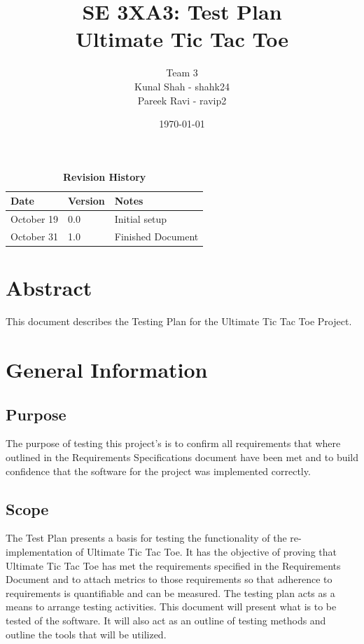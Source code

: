 \documentclass[12pt, titlepage]{article}
\title{SE 3XA3: Test Plan\\Ultimate Tic Tac Toe}
\author{Team 3
		\\ Kunal Shah - shahk24
		\\ Pareek Ravi - ravip2
}
\date{\today}
\begin{document}
\maketitle

\tableofcontents
\listoftables
\listoffigures

\begin{table}[bp]
\caption{\bf Revision History}
\begin{tabularx}{\textwidth}{p{3cm}p{2cm}X}
\toprule {\bf Date} & {\bf Version} & {\bf Notes}\\
\midrule
October 19 & 0.0 & Initial setup\\
October 31 & 1.0 & Finished Document \\
\bottomrule
\end{tabularx}
\end{table}

\newpage


\section*{Abstract} 
This document describes the Testing Plan for the Ultimate Tic Tac Toe Project.

\section{General Information}

\subsection{Purpose}
The purpose of testing this project's is to confirm all requirements that where
outlined in the Requirements Specifications document have been met and to build
confidence that the software for the project was implemented correctly.

\subsection{Scope}
The Test Plan presents a basis for testing the functionality of the re-
implementation of Ultimate Tic Tac Toe. It has the objective of proving that
Ultimate Tic Tac Toe has met the requirements specified in the Requirements
Document and to attach metrics to those requirements so that adherence to
requirements is quantifiable and can be measured. The testing plan acts as a
means to arrange testing activities. This document will present what is to be
tested of the software. It will also act as an outline of testing methods and
outline the tools that will be utilized.
\end{document}
